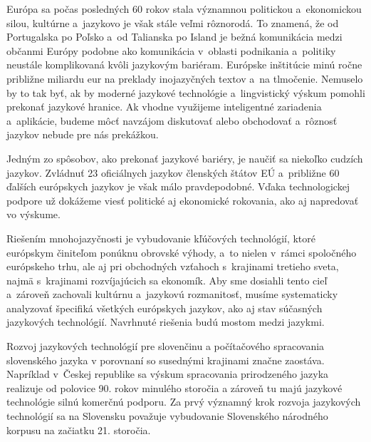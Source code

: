 \cleardoublepage

\setcounter{page}{1}
\pagestyle{scrheadings}

\begin{multicols}{2}
Európa sa počas posledných 60 rokov stala významnou politickou
a~ekonomickou silou, kultúrne a~jazykovo je však stále
veľmi rôznorodá. To znamená, že od Portugalska po Poľsko
a~od Talianska po Island je bežná komunikácia medzi občanmi Európy podobne ako komunikácia v~oblasti podnikania a~politiky neustále komplikovaná kvôli jazykovým bariéram. Európske inštitúcie minú ročne približne miliardu eur na preklady inojazyčných textov a~na tlmočenie. Nemuselo by to tak byť, ak by moderné jazykové technológie a~lingvistický výskum pomohli prekonať jazykové hranice. Ak vhodne využijeme inteligentné zariadenia a~aplikácie, budeme môcť navzájom diskutovať alebo obchodovať a~rôznosť jazykov nebude pre nás prekážkou.


Jedným zo spôsobov, ako prekonať jazykové bariéry, je naučiť sa
niekoľko cudzích jazykov. Zvládnuť 23 oficiálnych jazykov
členských štátov EÚ a~približne 60 ďalších európskych jazykov
je však málo pravdepodobné. Vďaka technologickej podpore už dokážeme
viesť politické aj ekonomické rokovania, ako aj napredovať vo
výskume.

Riešením mnohojazyčnosti je vybudovanie kľúčových technológií,
ktoré európskym činiteľom ponúknu obrovské výhody, a~to nielen
v~rámci spoločného európskeho trhu, ale aj pri obchodných vzťahoch
s~krajinami  tretieho sveta, najmä s~krajinami rozvíjajúcich sa ekonomík. Aby sme dosiahli tento cieľ a~zároveň zachovali kultúrnu
a~jazykovú rozmanitosť, musíme systematicky analyzovať špecifiká
všetkých európskych jazykov, ako aj stav súčasných jazykových
technológií. Navrhnuté riešenia budú mostom medzi jazykmi.



Rozvoj jazykových technológií pre slovenčinu a počítačového spracovania slovenského jazyka v porovnaní so susednými krajinami značne zaostáva. Napríklad v~Českej republike sa výskum spracovania prirodzeného jazyka realizuje od polovice 90. rokov minulého storočia a zároveň tu majú jazykové technológie silnú komerčnú podporu. Za prvý významný krok rozvoja jazykových technológií sa na Slovensku považuje vybudovanie Slovenského národného korpusu na začiatku 21. storočia. 


\end{multicols}
